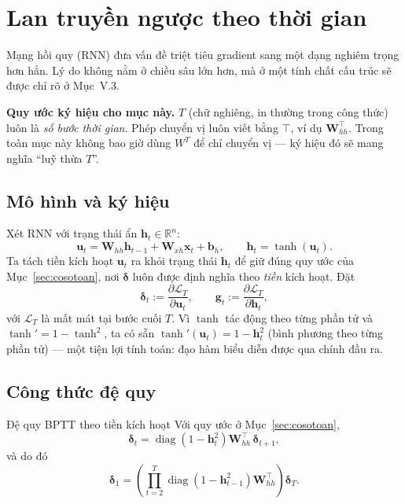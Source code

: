 \section{Lan truyền ngược theo thời gian}
\label{sec:bptt}

Mạng hồi quy (RNN) đưa vấn đề triệt tiêu gradient sang một dạng nghiêm trọng hơn
hẳn. Lý do không nằm ở chiều sâu lớn hơn, mà ở một tính chất cấu trúc sẽ được chỉ
rõ ở Mục~V.3.

\begin{notebox}
\textbf{Quy ước ký hiệu cho mục này.} $T$ (chữ nghiêng, in thường trong công
thức) luôn là \emph{số bước thời gian}. Phép chuyển vị luôn viết bằng $\top$, ví
dụ $\mathbf{W}_{hh}^{\top}$. Trong toàn mục này không bao giờ dùng $W^{T}$ để chỉ
chuyển vị --- ký hiệu đó sẽ mang nghĩa ``luỹ thừa $T$''.
\end{notebox}

\subsection{Mô hình và ký hiệu}

Xét RNN với trạng thái ẩn $\mathbf{h}_t\in\mathbb{R}^{n}$:
\begin{equation}
  \mathbf{u}_t = \mathbf{W}_{hh}\mathbf{h}_{t-1}
               + \mathbf{W}_{xh}\mathbf{x}_t + \mathbf{b}_h,
  \qquad
  \mathbf{h}_t = \tanh\!\left(\mathbf{u}_t\right).
  \label{eq:rnn}
\end{equation}
Ta tách tiền kích hoạt $\mathbf{u}_t$ ra khỏi trạng thái $\mathbf{h}_t$ để giữ
đúng quy ước của Mục~\ref{sec:cosotoan}, nơi $\boldsymbol{\delta}$ luôn được định
nghĩa theo \emph{tiền} kích hoạt. Đặt
\[
  \boldsymbol{\delta}_t := \frac{\partial\mathcal{L}_T}{\partial\mathbf{u}_t},
  \qquad
  \mathbf{g}_t := \frac{\partial\mathcal{L}_T}{\partial\mathbf{h}_t},
\]
với $\mathcal{L}_T$ là mất mát tại bước cuối $T$. Vì $\tanh$ tác động theo từng
phần tử và $\tanh' = 1 - \tanh^2$, ta có sẵn
$\tanh'(\mathbf{u}_t) = 1 - \mathbf{h}_t^2$ (bình phương theo từng phần tử) ---
một tiện lợi tính toán: đạo hàm biểu diễn được qua chính đầu ra.

\subsection{Công thức đệ quy}

\begin{infobox}{Đệ quy BPTT theo tiền kích hoạt}
Với quy ước ở Mục~\ref{sec:cosotoan},
\begin{equation}
  \boldsymbol{\delta}_t
  = \operatorname{diag}\!\left(1-\mathbf{h}_t^2\right)
    \mathbf{W}_{hh}^{\top}\,\boldsymbol{\delta}_{t+1},
  \label{eq:bpttrec}
\end{equation}
và do đó
\begin{equation}
  \boldsymbol{\delta}_1
  = \left(\prod_{t=2}^{T}
      \operatorname{diag}\!\left(1-\mathbf{h}_{t-1}^2\right)\mathbf{W}_{hh}^{\top}
    \right)\boldsymbol{\delta}_T .
  \label{eq:bpttprod}
\end{equation}
\end{infobox}

